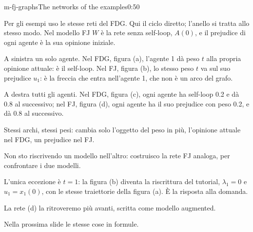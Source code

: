 \begin{slide}{m-fj-graphs}{The networks of the examples\nuova}{0:50}
  \begin{discorso}
    \item {\color{blue}Per gli esempi uso le stesse reti del FDG. Qui il ciclo diretto; l'anello si tratta allo stesso modo. Nel modello FJ $W$ è la rete senza self-loop, $A(0)$, e il prejudice di ogni agente è la sua opinione iniziale.}
    \item {\color{blue}A sinistra un solo agente. Nel FDG, figura (a), l'agente 1 dà peso $t$ alla propria opinione attuale: è il self-loop. Nel FJ, figura (b), lo stesso peso $t$ va sul suo prejudice $u_1$: è la freccia che entra nell'agente 1, che non è un arco del grafo.}
    \item {\color{blue}A destra tutti gli agenti. Nel FDG, figura (c), ogni agente ha self-loop 0.2 e dà 0.8 al successivo; nel FJ, figura (d), ogni agente ha il suo prejudice con peso 0.2, e dà 0.8 al successivo.}
    \item {\color{blue}Stessi archi, stessi pesi: cambia solo l'oggetto del peso in più, l'opinione attuale nel FDG, un prejudice nel FJ.}
    \item {\color{blue}Non sto riscrivendo un modello nell'altro: costruisco la rete FJ analoga, per confrontare i due modelli.}
    \item {\color{blue}L'unica eccezione è $t=1$: la figura (b) diventa la riscrittura del tutorial, $\lambda_1=0$ e $u_1=x_1(0)$, con le stesse traiettorie della figura (a). È la risposta alla domanda.}
    \item {\color{blue}La rete (d) la ritroveremo più avanti, scritta come modello augmented.}
    \item {\color{blue}Nella prossima slide le stesse cose in formule.}
  \end{discorso}
\end{slide}

